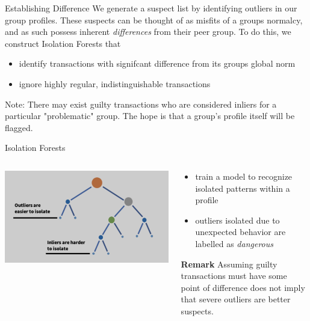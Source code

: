 \documentclass[aspectratio=169]{beamer}
\begin{document}
  \begin{frame}{Establishing Difference}
    We generate a suspect list by identifying outliers in our group profiles. These suspects can be thought 
    of as misfits of a groups normalcy, and as such possess inherent \textit{differences} from their peer group.
    To do this, we construct Isolation Forests that
    \begin{itemize}
      \item identify transactions with signifcant difference from its groups global norm
      \item ignore highly regular, indistinguishable transactions 
    \end{itemize}
    Note: There may exist guilty transactions who are considered inliers for a particular "problematic" group. The hope 
    is that a group's profile itself will be flagged. 
  \end{frame}

  \begin{frame}{Isolation Forests}
    \begin{columns}
      \begin{column}{0.5\textwidth}
        \includegraphics[width=\textwidth]{images/iso_forest.png}
      \end{column}
      \begin{column}{0.5\textwidth}
        \begin{itemize}
          \item train a model to recognize isolated patterns within a profile
          \item outliers isolated due to unexpected behavior are labelled as \textit{dangerous}
        \end{itemize}
        \textbf{Remark} Assuming guilty transactions must have some point of difference does not 
        imply that severe outliers are better suspects.
      \end{column}
    \end{columns}  
  \end{frame}
\end{document}
